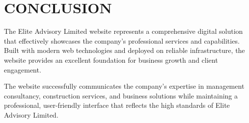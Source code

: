 \documentclass[11pt,a4paper]{article}
\begin{document}
\vspace{1cm}

\section*{\color{primaryBlue}CONCLUSION}

The Elite Advisory Limited website represents a comprehensive digital solution that effectively showcases the company's professional services and capabilities. Built with modern web technologies and deployed on reliable infrastructure, the website provides an excellent foundation for business growth and client engagement.

The website successfully communicates the company's expertise in management consultancy, construction services, and business solutions while maintaining a professional, user-friendly interface that reflects the high standards of Elite Advisory Limited.
\end{document}

